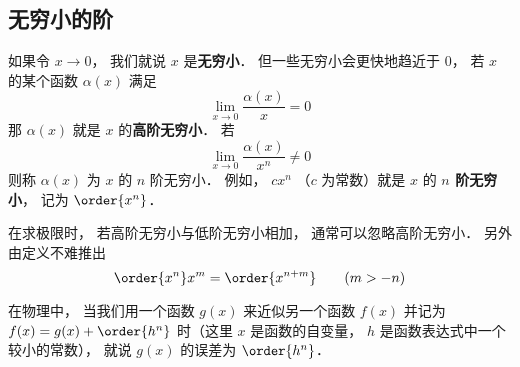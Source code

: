 \subsection{无穷小的阶}
如果令 $x\to 0$， 我们就说 $x$ 是\textbf{无穷小}． 但一些无穷小会更快地趋近于 $0$， 若 $x$ 的某个函数 $\alpha(x)$ 满足
\begin{equation}
\lim_{x\to 0} \frac{\alpha(x)}{x} = 0
\end{equation}
那 $\alpha(x)$ 就是 $x$ 的\textbf{高阶无穷小}． 若
\begin{equation}
\lim_{x\to 0} \frac{\alpha(x)}{x^n} \ne 0
\end{equation}
则称 $\alpha(x)$ 为 $x$ 的 $n$ 阶无穷小． 例如， $c x^n$ （$c$ 为常数）就是 $x$ 的 \textbf{$n$ 阶无穷小}， 记为 $\order{x^n}$．

在求极限时， 若高阶无穷小与低阶无穷小相加， 通常可以忽略高阶无穷小． 另外由定义不难推出
\begin{equation}
\order{x^n} x^m = \order{x^{n + m}} \qquad (m > -n)
\end{equation}

在物理中， 当我们用一个函数 $g(x)$ 来近似另一个函数 $f(x)$ 并记为 $f(x) = g(x) + \order{h^n}$ 时（这里 $x$ 是函数的自变量， $h$ 是函数表达式中一个较小的常数）， 就说 $g(x)$ 的误差为 $\order{h^n}$．
